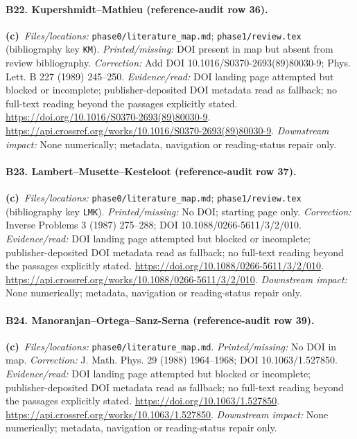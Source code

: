 \documentclass[11pt,a4paper]{article}
\newcommand{\C}{\textbf{(c)}\ }
\newcommand{\file}[1]{\nolinkurl{#1}}
\begin{document}
\paragraph{B22. Kupershmidt--Mathieu (reference-audit row 36).}
\C \textit{Files/locations:} \file{phase0/literature_map.md}; \file{phase1/review.tex} (bibliography key \file{KM}).
\textit{Printed/missing:} DOI present in map but absent from review bibliography.
\textit{Correction:} Add DOI 10.1016/S0370-2693(89)80030-9; Phys. Lett. B 227 (1989) 245--250.
\textit{Evidence/read:} DOI landing page attempted but blocked or incomplete; publisher-deposited DOI metadata read as fallback; no full-text reading beyond the passages explicitly stated.
\url{https://doi.org/10.1016/S0370-2693(89)80030-9}.
\url{https://api.crossref.org/works/10.1016/S0370-2693(89)80030-9}.
\textit{Downstream impact:} None numerically; metadata, navigation or reading-status repair only.
\paragraph{B23. Lambert--Musette--Kesteloot (reference-audit row 37).}
\C \textit{Files/locations:} \file{phase0/literature_map.md}; \file{phase1/review.tex} (bibliography key \file{LMK}).
\textit{Printed/missing:} No DOI; starting page only.
\textit{Correction:} Inverse Problems 3 (1987) 275--288; DOI 10.1088/0266-5611/3/2/010.
\textit{Evidence/read:} DOI landing page attempted but blocked or incomplete; publisher-deposited DOI metadata read as fallback; no full-text reading beyond the passages explicitly stated.
\url{https://doi.org/10.1088/0266-5611/3/2/010}.
\url{https://api.crossref.org/works/10.1088/0266-5611/3/2/010}.
\textit{Downstream impact:} None numerically; metadata, navigation or reading-status repair only.
\paragraph{B24. Manoranjan--Ortega--Sanz-Serna (reference-audit row 39).}
\C \textit{Files/locations:} \file{phase0/literature_map.md}.
\textit{Printed/missing:} No DOI in map.
\textit{Correction:} J. Math. Phys. 29 (1988) 1964--1968; DOI 10.1063/1.527850.
\textit{Evidence/read:} DOI landing page attempted but blocked or incomplete; publisher-deposited DOI metadata read as fallback; no full-text reading beyond the passages explicitly stated.
\url{https://doi.org/10.1063/1.527850}.
\url{https://api.crossref.org/works/10.1063/1.527850}.
\textit{Downstream impact:} None numerically; metadata, navigation or reading-status repair only.
\end{document}
